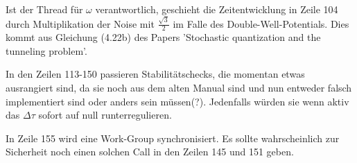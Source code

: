 \documentclass[a4paper,parskip=half,10pt]{scrartcl}
\begin{document}
Ist der Thread für $\omega$ verantwortlich, geschieht die Zeitentwicklung in Zeile 104 durch Multiplikation der Noise mit $\frac{\sqrt{3}}{2}$ im Falle des Double-Well-Potentials. Dies kommt aus Gleichung (4.22b) des Papers 'Stochastic quantization and the tunneling problem'.

In den Zeilen 113-150 passieren Stabilitätschecks, die momentan etwas ausrangiert sind, da sie noch aus dem alten Manual sind und nun entweder falsch implementiert sind oder anders sein müssen(?). Jedenfalls würden sie wenn aktiv das $\Delta \tau$ sofort auf null runterregulieren.

In Zeile 155 wird eine Work-Group synchronisiert. Es sollte wahrscheinlich zur Sicherheit noch einen solchen Call in den Zeilen 145 und 151 geben.
\end{document}
